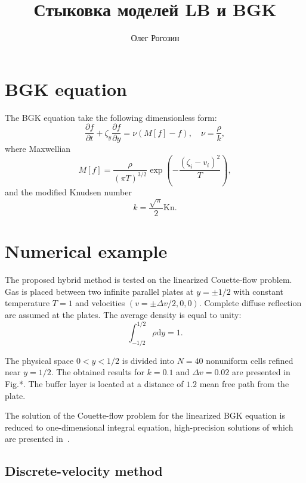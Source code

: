 \documentclass{article}
\title{Стыковка моделей LB и BGK}
\author{Олег Рогозин}
\theoremstyle{plain}
\newcommand{\Kn}{\mathrm{Kn}}
\newcommand{\dd}{\mathrm{d}}
\newcommand{\pder}[2][]{\frac{\partial#1}{\partial#2}}
\begin{document}
\section{BGK equation}

The BGK equation take the following dimensionless form:
\begin{equation}\label{eq:bgk}
    \pder[f]{t} + \zeta_y\pder[f]{y} = \nu(M[f]-f), \quad \nu = \frac{\rho}k,
\end{equation}
where Maxwellian
\begin{equation}\label{eq:Maxwell}
    M[f] = \frac{\rho}{(\pi T)^{3/2}}\exp\left(-\frac{(\zeta_i - v_i)^2}T\right),
\end{equation}
and the modified Knudsen number
\begin{equation}\label{eq:Knudsen}
    k = \frac{\sqrt\pi}2\Kn.
\end{equation}

\section{Numerical example}

The proposed hybrid method is tested on the linearized Couette-flow problem.
Gas is placed between two infinite parallel plates at \(y=\pm1/2\) with constant temperature \(T=1\)
and velocities \((v = \pm\Delta v/2, 0, 0)\).
Complete diffuse reflection are assumed at the plates.
The average density is equal to unity:
\begin{equation}\label{eq:total_mass}
    \int_{-1/2}^{1/2}\rho\dd{y} = 1.
\end{equation}

The physical space \(0<y<1/2\) is divided into \(N=40\) nonuniform cells refined near \(y=1/2\).
The obtained results for \(k=0.1\) and \(\Delta v = 0.02\) are presented in Fig.*.
The buffer layer is located at a distance of \(1.2\) mean free path from the plate.

The solution of the Couette-flow problem for the linearized BGK equation is reduced to one-dimensional integral equation,
high-precision solutions of which are presented in~\cite{Luo2015, Luo2016}.


\subsection{Discrete-velocity method}
\end{document}
